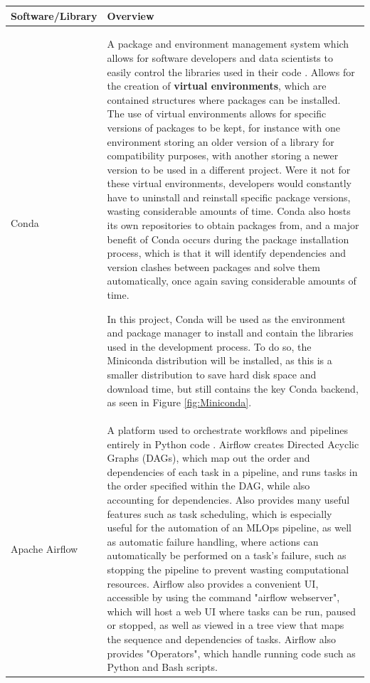 \documentclass[12pt]{report}
\begin{document}
\begin{longtable}{ |p{}| p{}|}
    \hline
    \cellcolor{blue!25}Software/Library & \cellcolor{blue!25}Overview\\
    \hline
    Conda 
    & A package and environment management system which allows 
    for software developers and data scientists to easily control the libraries used in their code \autocite{anaconda_about_nodate}. 
    Allows for the creation of \textbf{virtual environments}, which are contained structures where packages can be installed.
    The use of virtual environments allows for specific versions of packages to be kept, for instance with one environment 
    storing an older version of a library for compatibility purposes, with another storing a newer version to be used in a different project. 
    Were it not for these virtual environments, developers would constantly have to uninstall and reinstall specific package versions, wasting 
    considerable amounts of time. Conda also hosts its own repositories to obtain packages from, and a 
    major benefit of Conda occurs during the package installation process, which is that it will identify 
    dependencies and version clashes between packages and solve them automatically, once again saving 
    considerable amounts of time.
    
    In this project, Conda will be used as the environment and package manager to install and contain the 
    libraries used in the development process. To do so, the Miniconda distribution will be installed, as 
    this is a smaller distribution to save hard disk space and download time, but still contains the key 
    Conda backend, as seen in Figure \ref{fig:Miniconda}. \\
    \hline
    Apache Airflow &
    A platform used to orchestrate workflows and pipelines entirely in Python code \autocite{apache_use_nodate}.
    Airflow creates Directed Acyclic Graphs (DAGs), which map out the order and dependencies of each task in a 
    pipeline, and runs tasks in the order specified within the DAG, while also accounting for dependencies.
    Also provides many useful features such as task scheduling, which is especially useful for the automation 
    of an MLOps pipeline, as well as automatic failure handling, where actions can automatically be performed 
    on a task's failure, such as stopping the pipeline to prevent wasting computational resources. Airflow 
    also provides a convenient UI, accessible by using the command "airflow webserver", which will host a 
    web UI where tasks can be run, paused or stopped, as well as viewed in a tree view that maps the 
    sequence and dependencies of tasks. Airflow also provides "Operators", which handle running code such 
    as Python and Bash scripts.


\end{longtable}
\end{document}
